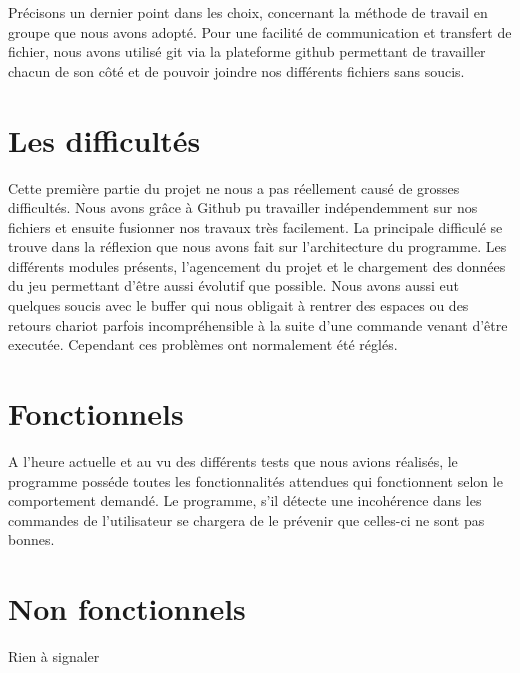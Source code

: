 \documentclass[10pt,a4paper,twocolumn]{report}
\begin{document}
Précisons un dernier point dans les choix, concernant la méthode de travail en groupe que nous avons adopté. Pour une facilité de communication et transfert de fichier, nous avons utilisé git via la plateforme github permettant de travailler chacun de son côté et de pouvoir joindre nos différents fichiers sans soucis.

\section{Les difficultés}

Cette première partie du projet ne nous a pas réellement causé de grosses difficultés. Nous avons grâce à Github pu travailler indépendemment sur nos fichiers et ensuite fusionner nos travaux très facilement.
La principale difficulé se trouve dans la réflexion que nous avons fait sur l'architecture du programme. Les différents modules présents, l'agencement du projet et le chargement des données du jeu permettant d'être aussi évolutif que possible.
Nous avons aussi eut quelques soucis avec le buffer qui nous obligait à rentrer des espaces ou des retours chariot parfois incompréhensible à la suite d'une commande venant d'être executée. Cependant ces problèmes ont normalement été réglés.

\section{Fonctionnels}

A l'heure actuelle et au vu des différents tests que nous avions réalisés, le programme posséde toutes les fonctionnalités attendues qui fonctionnent selon le comportement demandé.
Le programme, s'il détecte une incohérence dans les commandes de l'utilisateur se chargera de le prévenir que celles-ci ne sont pas bonnes.

\section{Non fonctionnels}
Rien à signaler
\end{document}
